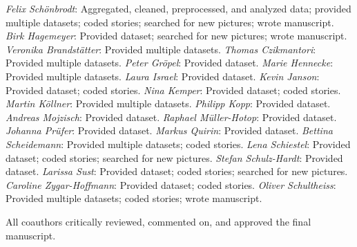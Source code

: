 \documentclass[jou,a4paper]{apa6}\usepackage[]{graphicx}\usepackage[]{color}
\begin{document}
 \small
 \emph{Felix Schönbrodt}: Aggregated, cleaned, preprocessed, and analyzed data; provided multiple datasets; coded stories; searched for new pictures; wrote manuscript. \emph{Birk Hagemeyer}: Provided dataset; searched for new pictures; wrote manuscript. \emph{Veronika Brandstätter}: Provided multiple datasets. \emph{Thomas Czikmantori}: Provided multiple datasets. \emph{Peter Gröpel}: Provided dataset. \emph{Marie Hennecke}: Provided multiple datasets. \emph{Laura Israel}: Provided dataset. \emph{Kevin Janson}: Provided dataset; coded stories. \emph{Nina Kemper}: Provided dataset; coded stories. \emph{Martin Köllner}: Provided multiple datasets. \emph{Philipp Kopp}: Provided dataset. \emph{Andreas Mojzisch}: Provided dataset. \emph{Raphael Müller-Hotop}: Provided dataset. \emph{Johanna Prüfer}: Provided dataset. \emph{Markus Quirin}: Provided dataset. \emph{Bettina Scheidemann}: Provided multiple datasets; coded stories. \emph{Lena Schiestel}: Provided dataset; coded stories; searched for new pictures. \emph{Stefan Schulz-Hardt}: Provided dataset. \emph{Larissa Sust}: Provided dataset; coded stories; searched for new pictures. \emph{Caroline Zygar-Hoffmann}: Provided dataset; coded stories. \emph{Oliver Schultheiss}: Provided multiple datasets; coded stories; wrote manuscript.

All coauthors critically reviewed, commented on, and approved the final manuscript.


\printbibliography
\end{document}
